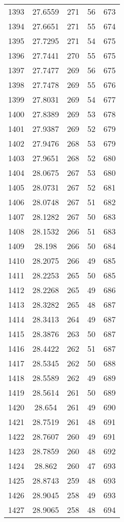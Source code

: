 \documentclass[12pt,a4paper]{article}
\begin{document}
\begin{tabular}{r|cccc}
	1393 & 27.6559 & 271 & 56 & 673 \\
	1394 & 27.6651 & 271 & 55 & 674 \\
	1395 & 27.7295 & 271 & 54 & 675 \\
	1396 & 27.7441 & 270 & 55 & 675 \\
	1397 & 27.7477 & 269 & 56 & 675 \\
	1398 & 27.7478 & 269 & 55 & 676 \\
	1399 & 27.8031 & 269 & 54 & 677 \\
	1400 & 27.8389 & 269 & 53 & 678 \\
	1401 & 27.9387 & 269 & 52 & 679 \\
	1402 & 27.9476 & 268 & 53 & 679 \\
	1403 & 27.9651 & 268 & 52 & 680 \\
	1404 & 28.0675 & 267 & 53 & 680 \\
	1405 & 28.0731 & 267 & 52 & 681 \\
	1406 & 28.0748 & 267 & 51 & 682 \\
	1407 & 28.1282 & 267 & 50 & 683 \\
	1408 & 28.1532 & 266 & 51 & 683 \\
	1409 & 28.198 & 266 & 50 & 684 \\
	1410 & 28.2075 & 266 & 49 & 685 \\
	1411 & 28.2253 & 265 & 50 & 685 \\
	1412 & 28.2268 & 265 & 49 & 686 \\
	1413 & 28.3282 & 265 & 48 & 687 \\
	1414 & 28.3413 & 264 & 49 & 687 \\
	1415 & 28.3876 & 263 & 50 & 687 \\
	1416 & 28.4422 & 262 & 51 & 687 \\
	1417 & 28.5345 & 262 & 50 & 688 \\
	1418 & 28.5589 & 262 & 49 & 689 \\
	1419 & 28.5614 & 261 & 50 & 689 \\
	1420 & 28.654 & 261 & 49 & 690 \\
	1421 & 28.7519 & 261 & 48 & 691 \\
	1422 & 28.7607 & 260 & 49 & 691 \\
	1423 & 28.7859 & 260 & 48 & 692 \\
	1424 & 28.862 & 260 & 47 & 693 \\
	1425 & 28.8743 & 259 & 48 & 693 \\
	1426 & 28.9045 & 258 & 49 & 693 \\
	1427 & 28.9065 & 258 & 48 & 694 \\

\end{tabular}
\end{document}
